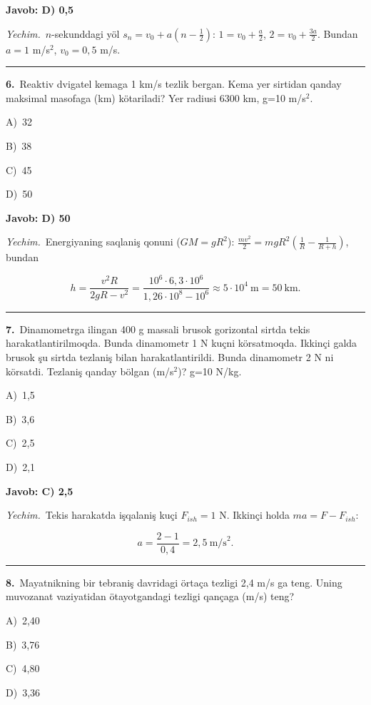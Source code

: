 \documentclass[11pt,a4paper]{article}
\newcommand{\opt}[2]{\hspace*{4mm}#1)\ #2\par}
\begin{document}
\noindent\colorbox{gray!12}{\parbox{\dimexpr\linewidth-2\fboxsep}{\textbf{Javob: D) 0,5}}}\par\smallskip
\noindent\textit{Yechim.}\ $n$-sekunddagi yöl $s_n=v_0+a\left(n-\frac12\right)$: $1=v_0+\frac{a}{2}$, $2=v_0+\frac{3a}{2}$. Bundan $a=1$ m/s$^2$, $v_0=0{,}5$ m/s.\par\par\medskip\hrule\medskip
{}\noindent\begin{minipage}{\linewidth}
\textbf{6.}\ Reaktiv dvigatel kemaga 1 km/s tezlik bergan. Kema yer sirtidan qanday maksimal masofaga (km) kötariladi? Yer radiusi 6300 km, g=10 m/s$^{2}$.\par\smallskip
\opt{A}{32}
\opt{B}{38}
\opt{C}{45}
\opt{D}{50}
\end{minipage}\vspace{2pt}\par
\noindent\colorbox{gray!12}{\parbox{\dimexpr\linewidth-2\fboxsep}{\textbf{Javob: D) 50}}}\par\smallskip
\noindent\textit{Yechim.}\ Energiyaning saqlaniş qonuni ($GM=gR^2$): $\frac{mv^2}{2}=mgR^2\left(\frac1R-\frac{1}{R+h}\right)$, bundan\par
\[h=\frac{v^2R}{2gR-v^2}=\frac{10^6\cdot6{,}3\cdot10^6}{1{,}26\cdot10^8-10^6}\approx5\cdot10^4\ \text{m}=50\ \text{km}.\]\par\medskip\hrule\medskip
{}\noindent\begin{minipage}{\linewidth}
\textbf{7.}\ Dinamometrga ilingan 400 g massali brusok gorizontal sirtda tekis harakatlantirilmoqda. Bunda dinamometr 1 N kuçni körsatmoqda. Ikkinçi galda brusok şu sirtda tezlaniş bilan harakatlantirildi. Bunda dinamometr 2 N ni körsatdi. Tezlaniş qanday bölgan (m/s$^{2}$)? g=10 N/kg.\par\smallskip
\opt{A}{1,5}
\opt{B}{3,6}
\opt{C}{2,5}
\opt{D}{2,1}
\end{minipage}\vspace{2pt}\par
\noindent\colorbox{gray!12}{\parbox{\dimexpr\linewidth-2\fboxsep}{\textbf{Javob: C) 2,5}}}\par\smallskip
\noindent\textit{Yechim.}\ Tekis harakatda işqalaniş kuçi $F_{ish}=1$ N. Ikkinçi holda $ma=F-F_{ish}$:\par
\[a=\frac{2-1}{0{,}4}=2{,}5\ \text{m/s}^2.\]\par\medskip\hrule\medskip
{}\noindent\begin{minipage}{\linewidth}
\textbf{8.}\ Mayatnikning bir tebraniş davridagi örtaça tezligi 2,4 m/s ga teng. Uning muvozanat vaziyatidan ötayotgandagi tezligi qançaga (m/s) teng?\par\smallskip
\opt{A}{2,40}
\opt{B}{3,76}
\opt{C}{4,80}
\opt{D}{3,36}
\end{minipage}\vspace{2pt}\par
\end{document}
